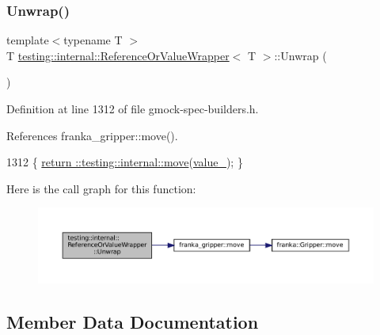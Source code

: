 \subsubsection{\texorpdfstring{Unwrap()}{Unwrap()}}
{\footnotesize\ttfamily template$<$typename T $>$ \\
T \hyperlink{classtesting_1_1internal_1_1ReferenceOrValueWrapper}{testing\+::internal\+::\+Reference\+Or\+Value\+Wrapper}$<$ T $>$\+::Unwrap (\begin{DoxyParamCaption}{ }\end{DoxyParamCaption})\hspace{0.3cm}{\ttfamily [inline]}}



Definition at line 1312 of file gmock-\/spec-\/builders.\+h.



References franka\+\_\+gripper\+::move().


\begin{DoxyCode}
1312 \{ \hyperlink{namespacefranka__gripper_a1356a87108d2229401d3755bd3e53bdf}{return ::testing::internal::move}(\hyperlink{classtesting_1_1internal_1_1ReferenceOrValueWrapper_a62278a25c713a8440aa56f4eba0fa815}{value\_}); \}
\end{DoxyCode}
Here is the call graph for this function\+:
\nopagebreak
\begin{figure}[H]
\begin{center}
\leavevmode
\includegraphics[width=350pt]{classtesting_1_1internal_1_1ReferenceOrValueWrapper_a5a6505b809ba770725e7b8091927a5ba_cgraph}
\end{center}
\end{figure}


\subsection{Member Data Documentation}
\mbox{\label{classtesting_1_1internal_1_1ReferenceOrValueWrapper_a62278a25c713a8440aa56f4eba0fa815}} 
